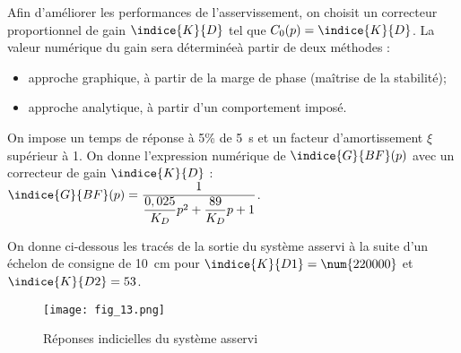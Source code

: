 Afin d’améliorer les performances de l’asservissement, on choisit un correcteur proportionnel de gain 
$\indice{K}{D}$ tel que $C_0(p) = \indice{K}{D}$. La valeur numérique du gain sera déterminéeà partir de deux méthodes :
\begin{itemize}
\item approche graphique, à partir de la marge de phase (maîtrise de la stabilité);
\item approche analytique, à partir d’un comportement imposé.
\end{itemize}


 On impose un temps de réponse à 5\% de \SI{5}{s} et un facteur d’amortissement $\xi$ supérieur à 1.
 On donne l’expression numérique de $\indice{G}{BF}(p)$ avec un correcteur de gain $\indice{K}{D}$ :
 $\indice{G}{BF}(p)=\dfrac{1}{\dfrac{0,025}{K_D}p^2+\dfrac{89}{K_D}p +1}$.
 
 


 On donne ci-dessous les tracés de la sortie du système asservi à la suite d’un échelon de consigne de 
\SI{10}{cm} pour $\indice{K}{D1} = \num{220000}$ et $\indice{K}{D2} = 53$.


\begin{figure}[!h]
\centering
\texttt{[image: fig\_13.png]}
\caption{Réponses indicielles du système asservi \label{fig_13}}
\end{figure}

